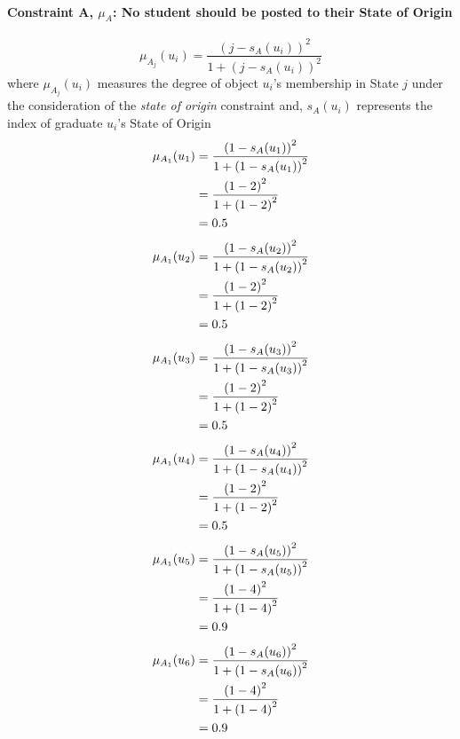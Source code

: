 \documentclass[a4paper,openany]{book}
\begin{document}
			\paragraph{Constraint A, $\mu_A$: No student should be posted to their State of Origin}
				\begin{equation}
					\mu_{A_j}(u_i) = \frac{\left(j-s_A(u_i)\right)^2}{1 + \left(j-s_A(u_i)\right)^2}
				\end{equation}
				where $\mu_{A_j}(u_i)$ measures the degree of object $u_i$'s membership in State $j$ under the consideration of the \textit{state of origin} constraint and,
				$s_A(u_i)$ represents the index of graduate $u_i$'s State of Origin
				\begin{align}
					\mu_{A_1}(u_1) &= \frac{\left(1-s_A(u_1)\right)^2}{1 + \left(1-s_A(u_1)\right)^2}\\
					&= \frac{\left(1-2\right)^2}{1 + \left(1-2\right)^2} \notag \\
					&= 0.5 \notag
				\end{align}
				\begin{align}
					\mu_{A_1}(u_2) &= \frac{\left(1-s_A(u_2)\right)^2}{1 + \left(1-s_A(u_2)\right)^2}\\
					&= \frac{\left(1-2\right)^2}{1 + \left(1-2\right)^2} \notag \\
					&= 0.5 \notag
				\end{align}
				\begin{align}
					\mu_{A_1}(u_3) &= \frac{\left(1-s_A(u_3)\right)^2}{1 + \left(1-s_A(u_3)\right)^2}\\
					&= \frac{\left(1-2\right)^2}{1 + \left(1-2\right)^2} \notag \\
					&= 0.5 \notag
				\end{align}
				\begin{align}
					\mu_{A_1}(u_4) &= \frac{\left(1-s_A(u_4)\right)^2}{1 + \left(1-s_A(u_4)\right)^2}\\
					&= \frac{\left(1-2\right)^2}{1 + \left(1-2\right)^2} \notag \\
					&= 0.5 \notag
				\end{align}
				\begin{align}
					\mu_{A_1}(u_5) &= \frac{\left(1-s_A(u_5)\right)^2}{1 + \left(1-s_A(u_5)\right)^2}\\
					&= \frac{\left(1-4\right)^2}{1 + \left(1-4\right)^2} \notag \\
					&= 0.9 \notag
				\end{align}
				\begin{align}
					\mu_{A_1}(u_6) &= \frac{\left(1-s_A(u_6)\right)^2}{1 + \left(1-s_A(u_6)\right)^2}\\
					&= \frac{\left(1-4\right)^2}{1 + \left(1-4\right)^2} \notag \\
					&= 0.9 \notag
				\end{align}
\end{document}
